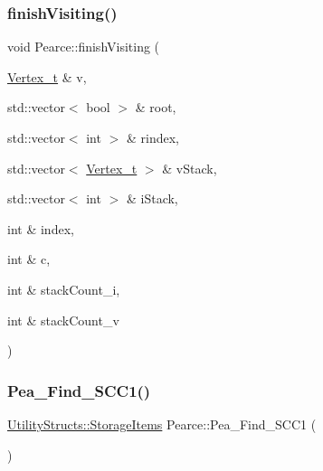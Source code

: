 \subsubsection{\texorpdfstring{finish\+Visiting()}{finishVisiting()}}
{\footnotesize\ttfamily void Pearce\+::finish\+Visiting (\begin{DoxyParamCaption}\item[{\hyperlink{class_graph_component_ae67114a6ce5a001dc35e1996e1b45aa0_ae67114a6ce5a001dc35e1996e1b45aa0}{Vertex\+\_\+t} \&}]{v,  }\item[{std\+::vector$<$ bool $>$ \&}]{root,  }\item[{std\+::vector$<$ int $>$ \&}]{rindex,  }\item[{std\+::vector$<$ \hyperlink{class_graph_component_ae67114a6ce5a001dc35e1996e1b45aa0_ae67114a6ce5a001dc35e1996e1b45aa0}{Vertex\+\_\+t} $>$ \&}]{v\+Stack,  }\item[{std\+::vector$<$ int $>$ \&}]{i\+Stack,  }\item[{int \&}]{index,  }\item[{int \&}]{c,  }\item[{int \&}]{stack\+Count\+\_\+i,  }\item[{int \&}]{stack\+Count\+\_\+v }\end{DoxyParamCaption})}

\mbox{\label{class_pearce_a4a78c1ec037146537f575fa62b1e0265_a4a78c1ec037146537f575fa62b1e0265}} 
\subsubsection{\texorpdfstring{Pea\+\_\+\+Find\+\_\+\+S\+C\+C1()}{Pea\_Find\_SCC1()}}
{\footnotesize\ttfamily \hyperlink{struct_utility_structs_1_1_storage_items}{Utility\+Structs\+::\+Storage\+Items} Pearce\+::\+Pea\+\_\+\+Find\+\_\+\+S\+C\+C1 (\begin{DoxyParamCaption}{ }\end{DoxyParamCaption})}

\mbox{\label{class_pearce_a4764238b69ee587134a9009619a4cae5_a4764238b69ee587134a9009619a4cae5}} 
